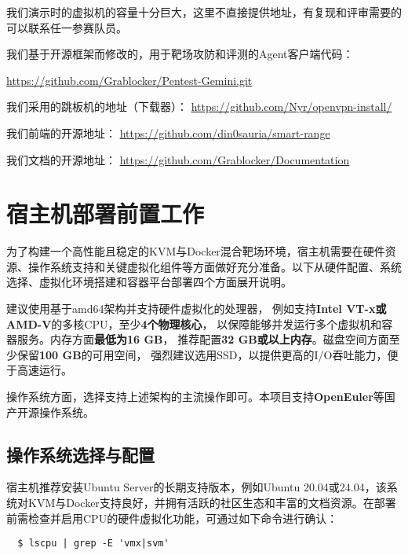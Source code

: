 \documentclass[lang=cn,10pt]{elegantbook}
\begin{document}
我们演示时的虚拟机的容量十分巨大，这里不直接提供地址，有复现和评审需要的可以联系任一参赛队员。

我们基于开源框架而修改的，用于靶场攻防和评测的Agent客户端代码：

\href{https://github.com/Grablocker/Pentest-Gemini.git}{https://github.com/Grablocker/Pentest-Gemini.git}

我们采用的跳板机的地址（下载器）：
\href{https://github.com/Nyr/openvpn-install/}{https://github.com/Nyr/openvpn-install/}

我们前端的开源地址：
\href{https://github.com/din0sauria/smart_range}{https://github.com/din0sauria/smart-range}

我们文档的开源地址：
\href{https://github.com/Grablocker/Documentation}{https://github.com/Grablocker/Documentation}





\section{宿主机部署前置工作}

为了构建一个高性能且稳定的KVM与Docker混合靶场环境，宿主机需要在硬件资源、操作系统支持和关键虚拟化组件等方面做好充分准备。以下从硬件配置、系统选择、虚拟化环境搭建和容器平台部署四个方面展开说明。

\begin{proposition}
  建议使用基于amd64架构并支持硬件虚拟化的处理器，
  例如支持\textbf{Intel VT-x或AMD-V}的多核CPU，至少\textbf{4个物理核心}，
  以保障能够并发运行多个虚拟机和容器服务。内存方面\textbf{最低为16 GB}，
  推荐配置\textbf{32 GB或以上内存}。磁盘空间方面至少保留\textbf{100 GB}的可用空间，
  强烈建议选用SSD，以提供更高的I/O吞吐能力，便于高速运行。
  
  操作系统方面，选择支持上述架构的主流操作即可。本项目支持\textbf{OpenEuler}等国产开源操作系统。
\end{proposition}


\subsection{操作系统选择与配置}

宿主机推荐安装Ubuntu Server的长期支持版本，例如Ubuntu 20.04或24.04，该系统对KVM与Docker支持良好，并拥有活跃的社区生态和丰富的文档资源。在部署前需检查并启用CPU的硬件虚拟化功能，可通过如下命令进行确认：


\begin{verbatim}
  $ lscpu | grep -E 'vmx|svm'
\end{verbatim}
\end{document}
